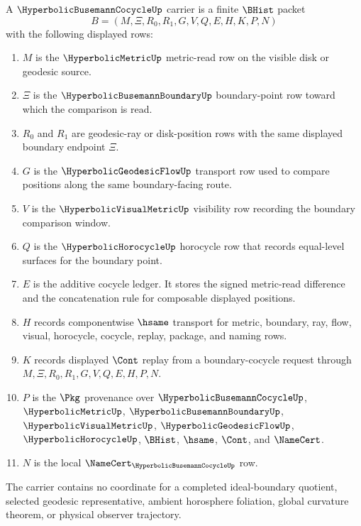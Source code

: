 \begin{definition}
\label{def:hyperbolic-busemann-cocycle-carrier}
A $\HyperbolicBusemannCocycleUp$ carrier is a finite $\BHist$ packet
$$
B=(M,\Xi,R_0,R_1,G,V,Q,E,H,K,P,N)
$$
with the following displayed rows:
\begin{enumerate}
\item $M$ is the $\HyperbolicMetricUp$ metric-read row on the visible disk or geodesic source.
\item $\Xi$ is the $\HyperbolicBusemannBoundaryUp$ boundary-point row toward which the comparison is read.
\item $R_0$ and $R_1$ are geodesic-ray or disk-position rows with the same displayed boundary endpoint $\Xi$.
\item $G$ is the $\HyperbolicGeodesicFlowUp$ transport row used to compare positions along the same boundary-facing route.
\item $V$ is the $\HyperbolicVisualMetricUp$ visibility row recording the boundary comparison window.
\item $Q$ is the $\HyperbolicHorocycleUp$ horocycle row that records equal-level surfaces for the boundary point.
\item $E$ is the additive cocycle ledger. It stores the signed metric-read difference and the concatenation rule for composable displayed positions.
\item $H$ records componentwise $\hsame$ transport for metric, boundary, ray, flow, visual, horocycle, cocycle, replay, package, and naming rows.
\item $K$ records displayed $\Cont$ replay from a boundary-cocycle request through $M,\Xi,R_0,R_1,G,V,Q,E,H,P,N$.
\item $P$ is the $\Pkg$ provenance over $\HyperbolicBusemannCocycleUp$, $\HyperbolicMetricUp$, $\HyperbolicBusemannBoundaryUp$, $\HyperbolicVisualMetricUp$, $\HyperbolicGeodesicFlowUp$, $\HyperbolicHorocycleUp$, $\BHist$, $\hsame$, $\Cont$, and $\NameCert$.
\item $N$ is the local $\NameCert_{\HyperbolicBusemannCocycleUp}$ row.
\end{enumerate}
The carrier contains no coordinate for a completed ideal-boundary quotient, selected geodesic representative, ambient horosphere foliation, global curvature theorem, or physical observer trajectory.
\end{definition}

